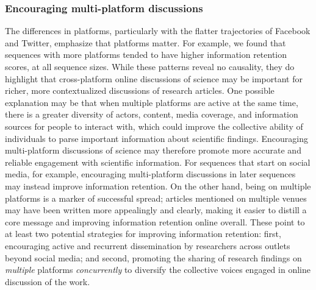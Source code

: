 \documentclass[letterpaper]{article} %
\begin{document}
\subsubsection{Encouraging multi-platform discussions}
The differences in platforms, particularly with the flatter trajectories of Facebook and Twitter, emphasize that platforms matter. For example, we found that sequences with more platforms tended to have higher information retention scores, at all sequence sizes. While these patterns reveal no causality, they do highlight that cross-platform online discussions of science may be important for richer, more contextualized discussions of research articles. One possible explanation may be that when multiple platforms are active at the same time, there is a greater diversity of actors, content, media coverage, and information sources for people to interact with, which could improve the collective ability of individuals to parse important information about scientific findings.
Encouraging multi-platform discussions of science may therefore promote more accurate and reliable engagement with scientific information. For sequences that start on social media, for example, encouraging multi-platform discussions in later sequences may instead improve information retention. 
On the other hand, being on multiple platforms is a marker of successful spread; articles mentioned on multiple venues may have been written more appealingly and clearly, making it easier to distill a core message and improving information retention online overall. 
These point to at least two potential strategies for improving information retention: first, encouraging active and recurrent dissemination by researchers across outlets beyond social media; and second, promoting the sharing of research findings on \textit{multiple} platforms \textit{concurrently} to diversify the collective voices engaged in online discussion of the work.
\end{document}

